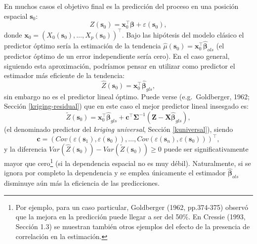 \documentclass[
]{book}
\theoremstyle{break}
\theoremstyle{definition}
\theoremstyle{definition}
\theoremstyle{definition}
\theoremstyle{definition}
\theoremstyle{remark}
\begin{document}
En muchos casos el objetivo final es la predicción del proceso en una posición espacial \(\mathbf{s}_{0}\):
\[Z(\mathbf{s}_{0} )=\mathbf{x}_0^{\top}\boldsymbol{\beta}+\varepsilon (\mathbf{s}_{0} ),\]
donde \(\mathbf{x}_0=\left( X_{0} (\mathbf{s}_{0} ), \ldots,X_{p} (\mathbf{s}_{0})\right)^{\top}\).
Bajo las hipótesis del modelo clásico el predictor óptimo sería la estimación de la tendencia \(\hat{\mu}(\mathbf{s}_{0} ) = \mathbf{x}_0^\top \hat{\boldsymbol{\beta}}_{ols}\) (el predictor óptimo de un error independiente sería cero).
En el caso general, siguiendo esta aproximación, podríamos pensar en utilizar como predictor el estimador más eficiente de la tendencia:
\[\hat{Z} (\mathbf{s}_{0})=\mathbf{x}_0^\top \hat{\boldsymbol{\beta}}_{gls},\]
sin embargo no es el predictor lineal óptimo. Puede verse (e.g.~Goldberger, 1962; Sección \ref{kriging-residual}) que en este caso el mejor predictor lineal insesgado es:
\begin{equation} 
  \tilde{Z}(\mathbf{s}_{0}) = \mathbf{x}_0^{\top}\hat{\boldsymbol{\beta}}_{gls} + \mathbf{c}^{\top} \boldsymbol{\Sigma}^{-1} \left( \mathbf{Z} - \mathbf{X}\hat{\boldsymbol{\beta}}_{gls} \right),
  \label{eq:predictor-kriging}
\end{equation}
(el denominado predictor del \emph{kriging universal}, Sección \ref{kuniversal}), siendo
\[\mathbf{c} = \left( Cov\left( \varepsilon (\mathbf{s}_{1} ),\varepsilon (\mathbf{s}_{0} )\right), \ldots, Cov\left( \varepsilon (\mathbf{s}_{n} ),\varepsilon (\mathbf{s}_{0} )\right) \right)^{\top},\]
y la diferencia \(Var( \hat{Z} (\mathbf{s}_{0} ) ) - Var( \tilde{Z} (\mathbf{s}_{0} ) ) \ge 0\) puede ser significativamente mayor que cero\footnote{Por ejemplo, para un caso particular, Goldberger (1962, pp.374-375) observó que la mejora en la predicción puede llegar a ser del 50\%. En Cressie (1993, Sección 1.3) se muestran también otros ejemplos del efecto de la presencia de correlación en la estimación.} (si la dependencia espacial no es muy débil).
Naturalmente, si se ignora por completo la dependencia y se emplea únicamente el estimador \(\hat{\boldsymbol{\beta}}_{ols}\) disminuye aún más la eficiencia de las predicciones.
\end{document}
